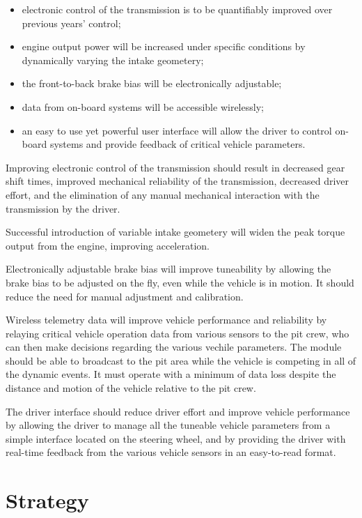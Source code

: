 \begin{itemize}
 \item electronic control of the transmission is to be quantifiably improved over previous years' control;
 \item engine output power will be increased under specific conditions by dynamically varying the intake geometery;
 \item the front-to-back brake bias will be electronically adjustable;
 \item data from on-board systems will be accessible wirelessly;
 \item an easy to use yet powerful user interface will allow the driver to control on-board systems and provide feedback of critical vehicle parameters.
\end{itemize}

Improving electronic control of the transmission should result in decreased gear shift times, improved mechanical reliability of the transmission, decreased driver effort, and the elimination of any manual mechanical interaction with the transmission by the driver.

Successful introduction of variable intake geometery will widen the peak torque output from the engine, improving acceleration.

Electronically adjustable brake bias will improve tuneability by allowing the brake bias to be adjusted on the fly, even while the vehicle is in motion. It should reduce the need for manual adjustment and calibration.

Wireless telemetry data will improve vehicle performance and reliability by relaying critical vehicle operation data from various sensors to the pit crew, who can then make decisions regarding the various vechile parameters. The module should be able to broadcast to the pit area while the vehicle is competing in all of the dynamic events. It must operate with a minimum of data loss despite the distance and motion of the vehicle relative to the pit crew.

The driver interface should reduce driver effort and improve vehicle performance by allowing the driver to manage all the tuneable vehicle parameters from a simple interface located on the steering wheel, and by providing the driver with real-time feedback from the various vehicle sensors in an easy-to-read format.

\section{Strategy}


